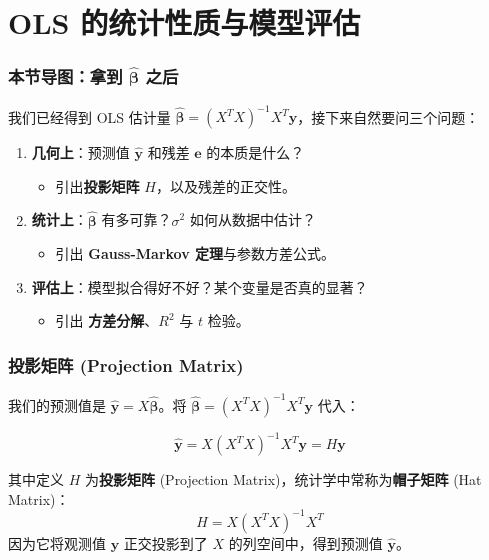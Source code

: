 
\section[统计推断]{OLS 的统计性质与模型评估}


\begin{frame}
\frametitle{本节导图：拿到 $\hat{\boldsymbol{\beta}}$ 之后}

我们已经得到 OLS 估计量 $\hat{\boldsymbol{\beta}} = (X^TX)^{-1}X^T\mathbf{y}$，接下来自然要问三个问题：

\begin{enumerate}
    \item \textbf{几何上}：预测值 $\hat{\mathbf{y}}$ 和残差 $\mathbf{e}$ 的本质是什么？
    \begin{itemize}\item 引出\textbf{投影矩阵} $H$，以及残差的正交性。\end{itemize}
    \item \textbf{统计上}：$\hat{\boldsymbol{\beta}}$ 有多可靠？$\sigma^2$ 如何从数据中估计？
    \begin{itemize}\item 引出 \textbf{Gauss-Markov 定理}与参数方差公式。\end{itemize}
    \item \textbf{评估上}：模型拟合得好不好？某个变量是否真的显著？
    \begin{itemize}\item 引出 \textbf{方差分解}、$R^2$ 与 $t$ 检验。\end{itemize}
\end{enumerate}

\end{frame}


\begin{frame}
\frametitle{投影矩阵 (Projection Matrix)}

我们的预测值是 $\hat{\mathbf{y}} = X \hat{\boldsymbol{\beta}}$。将 $\hat{\boldsymbol{\beta}} = (X^T X)^{-1} X^T \mathbf{y}$ 代入：

\[
\hat{\mathbf{y}} = X (X^T X)^{-1} X^T \mathbf{y} = H \mathbf{y}
\]

其中定义 $H$ 为\textbf{投影矩阵} (Projection Matrix)，统计学中常称为\textbf{帽子矩阵} (Hat Matrix)：
\[
H = X (X^T X)^{-1} X^T
\]
因为它将观测值 $\mathbf{y}$ 正交投影到了 $X$ 的列空间中，得到预测值 $\hat{\mathbf{y}}$。

\end{frame}

